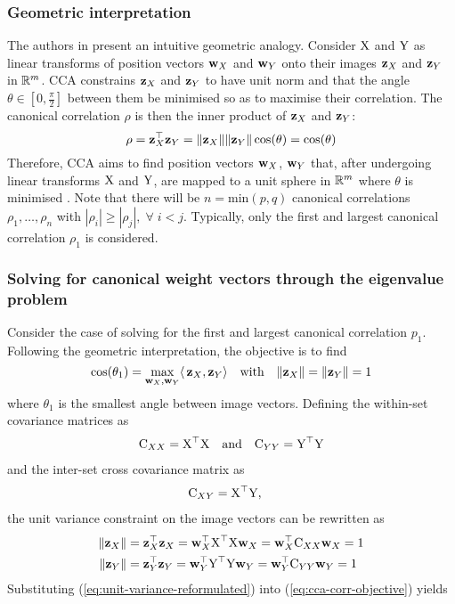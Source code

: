 \subsubsection{Geometric interpretation}
The authors in \cite{cca-tutorial} present an intuitive geometric analogy. Consider ${\textrm{X}}$ and ${\textrm{Y}}$ as linear transforms of position vectors ${\mathbf{w}}_X$ and ${\mathbf{w}}_Y$ onto their images ${\mathbf{z}}_X$ and ${\mathbf{z}}_Y$ in $\mathbb{R}^m$. CCA constrains ${\mathbf{z}}_X$ and ${\mathbf{z}}_Y$ to have unit norm and that the angle $\theta \in [0, \frac{\pi}{2}]$ between them be minimised so as to maximise their correlation. The canonical correlation $\rho$ is then the inner product of ${\mathbf{z}}_X$ and ${\mathbf{z}}_Y$:
\begin{equation}
    \rho = {\mathbf{z}}_X^\top{\mathbf{z}}_Y = \|{\mathbf{z}}_X\| \|{\mathbf{z}}_Y\|\cos(\theta) = \cos(\theta)
\end{equation}
Therefore, CCA aims to find position vectors ${\mathbf{w}}_X$, ${\mathbf{w}}_Y$ that, after undergoing linear transforms ${\textrm{X}}$ and ${\textrm{Y}}$, are mapped to a unit sphere in $\mathbb{R}^m$ where $\theta$ is minimised \cite{cca-tutorial}. Note that there will be $n=\textrm{min}(p, q)$ canonical correlations $\rho_1, \dots, \rho_n$ with $|\rho_i| \geq |\rho_j|, \; \forall \; i < j$. Typically, only the first and largest canonical correlation $\rho_1$ is considered. 

\subsubsection{Solving for canonical weight vectors through the eigenvalue problem}
Consider the case of solving for the first and largest canonical correlation $p_1$. Following the geometric interpretation, the objective is to find
\begin{equation}
    \cos(\theta_1) = \max_{{\mathbf{w}}_X, {\mathbf{w}}_Y}\langle\,{\mathbf{z}}_X,{\mathbf{z}}_Y\rangle \quad \textrm{with} \quad \|{\mathbf{z}}_X\| = \|{\mathbf{z}}_Y\| = 1
\label{eq:cca-objective-1}
\end{equation}
where $\theta_1$ is the smallest angle between image vectors. Defining the within-set covariance matrices as 
\begin{align}
    {\textrm{C}}_{XX} = {\textrm{X}}^\top{\textrm{X}} \quad \textrm{and} \quad
    {\textrm{C}}_{YY} = {\textrm{Y}}^\top {\textrm{Y}} 
\end{align}
and the inter-set cross covariance matrix as 
\begin{align}
    {\textrm{C}}_{XY} &= {\textrm{X}}^\top{\textrm{Y}},
\end{align}
the unit variance constraint on the image vectors can be rewritten as  \begin{align}
\begin{split}
    \|{\mathbf{z}}_X\| &= {\mathbf{z}}_X^\top{\mathbf{z}}_X = {\mathbf{w}}_X^\top {\textrm{X}}^\top {\textrm{X}} {\mathbf{w}}_X =  {\mathbf{w}}_X^\top {\textrm{C}}_{XX} {\mathbf{w}}_X = 1 \\
    \|{\mathbf{z}}_Y\| &= {\mathbf{z}}_Y^\top{\mathbf{z}}_Y = {\mathbf{w}}_Y^\top {\textrm{Y}}^\top {\textrm{Y}} {\mathbf{w}}_Y =  {\mathbf{w}}_Y^\top {\textrm{C}}_{YY} {\mathbf{w}}_Y = 1 
    \end{split}
\label{eq:unit-variance-reformulated}
\end{align}
Substituting (\ref{eq:unit-variance-reformulated}) into (\ref{eq:cca-corr-objective}) yields 

